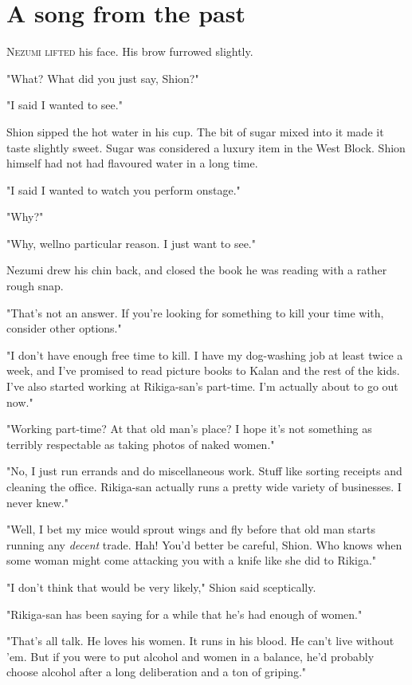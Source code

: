 
\chapter{A song from the past}

\lettrine{N}{ezumi lifted} his face. His brow furrowed slightly.

"What? What did you just say, Shion?"

"I said I wanted to see."

Shion sipped the hot water in his cup. The bit of sugar mixed into it
made it taste slightly sweet. Sugar was considered a luxury item in the
West Block. Shion himself had not had flavoured water in a long time.

"I said I wanted to watch you perform onstage."

"Why?"

"Why, well\el no particular reason. I just want to see."

Nezumi drew his chin back, and closed the book he was reading with a
rather rough snap.

"That's not an answer. If you're looking for something to kill your time
with, consider other options."

"I don't have enough free time to kill. I have my dog-washing job at
least twice a week, and I've promised to read picture books to Kalan and
the rest of the kids. I've also started working at Rikiga-san's
part-time. I'm actually about to go out now."

"Working part-time? At that old man's place? I hope it's not something
as terribly respectable as taking photos of naked women."

"No, I just run errands and do miscellaneous work. Stuff like sorting
receipts and cleaning the office. Rikiga-san actually runs a pretty wide
variety of businesses. I never knew."

"Well, I bet my mice would sprout wings and fly before that old man
starts running any \emph{decent} trade. Hah! You'd better be careful, Shion.
Who knows when some woman might come attacking you with a knife like she
did to Rikiga."

"I don't think that would be very likely," Shion said sceptically.

"Rikiga-san has been saying for a while that he's had enough of women."

"That's all talk. He loves his women. It runs in his blood. He can't
live without 'em. But if you were to put alcohol and women in a balance,
he'd probably choose alcohol after a long deliberation and a ton of
griping."

